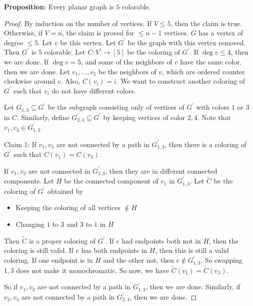\documentclass{report}
\begin{document}
\textbf{Proposition}: Every planar graph is $5$ colorable.
    \begin{proof}
        By induction on the number of vertices. If $V \leq 5$, then the claim is true. Otherwise, if $V = n$, the claim is proved for $\leq n - 1$ vertices. $ G$ has a vertex of degree $\leq 5$. Let $v$ be this vertex. Let $G^{\prime}$ be the graph with this vertex removed. Then $G^{\prime}$ is $5$ colorable. Let $C : V^{\prime} \rightarrow [ 5]$ be the coloring of $G^{\prime}$. If $\deg v \leq 4$, then we are done. If $\deg v = 5$, and some of the neighbors of $v$ have the same color, then we are done. Let $v_{1},  \ldots, v_{ 5}$ be the neighbors of $v$, which are ordered counter clockwise around $v$. Also, $C(v_{i}) = i$. We want to construct another coloring of $G^{\prime}$ such that $v_{i}$ do not have different colors. 

        Let $G^{\prime}_{1, 3} \subseteq G^{\prime}$ be the subgraph consisting only of vertices of $G^{\prime}$ with colors $1$ or $3$ in $C$. Similarly, define $G^{\prime}_{2, 4} \subseteq G^{\prime}$ by keeping vertices of color $2, 4$. Note that $v_{1}, v_{3} \in G^{\prime}_{1, 3}$. 

        Claim 1: If $v_{1}, v_{3}$ are not connected by a path in $G^{\prime}_{1, 3}$, then there is a coloring of $G^{\prime}$ such that $C(v_{1}) = C(v_{3})$.

        If $v_{1}, v_{3}$ are not connected in $G^{\prime}_{1, 3}$, then they are in different connected components. Let $H$ be the connected component of $v_{1}$ in $G^{\prime}_{1, 3}$. Let $\tilde{C}$ be the coloring of $G^{\prime}$ obtained by
            \begin{itemize}
                \item Keeping the coloring of all vertices $\notin H$

                \item Changing $1$ to $3$ and $3$ to $1$ in $H$ 
            \end{itemize}
        Then $\tilde{C}$ is a proper coloring of $G^{\prime}$. If $e$ had endpoints both not in $H$, then the coloring is still valid. If $e$ has both endpoints in $H$, then this is still a valid coloring. If one endpoint is in $H$ and the other not, then $e \notin G^{\prime}_{1, 3}$. So swapping $1, 3$ does not make it monochromatic. So now, we have $\tilde{C}(v_{1}) = \tilde{C}(v_{3})$. 

        So if $v_{1}, v_{3}$ are not connected by a path in $G^{\prime}_{1, 3}$, then we are done. Similarly, if $v_{2}, v_{4}$ are not connected by a path in $G^{\prime}_{2, 4}$, then we are done.


\end{proof}
\end{document}
